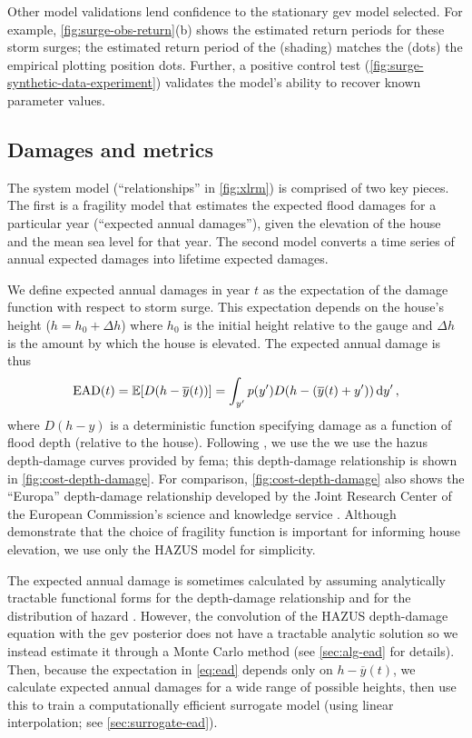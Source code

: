 \documentclass[11pt]{article}
\makeatletter
\DeclareRobustCommand\onedot{\futurelet\@let@token\@onedot}
\def\@onedot{\ifx\@let@token.\else.\null\fi\xspace}
\def\eg{\emph{e.g}\onedot} \def\Eg{\emph{E.g}\onedot}
\DeclareRobustCommand\onedot{\futurelet\@let@token\@onedot}
\def\@onedot{\ifx\@let@token.\else.\null\fi\xspace}
\def\eg{\emph{e.g}\onedot} \def\Eg{\emph{E.g}\onedot}
\makeatother
\begin{document}
Other model validations lend confidence to the stationary \gls{gev} model selected.
For example, \cref{fig:surge-obs-return}(b) shows the estimated return periods for these storm surges; the estimated return period of the (shading) matches the (dots) the empirical plotting position dots.
Further, a positive control test (\cref{fig:surge-synthetic-data-experiment}) validates the model's ability to recover known parameter values.

\subsection{Damages and metrics}\label{sec:case-metrics}

The system model (``relationships'' in \cref{fig:xlrm}) is comprised of two key pieces.
The first is a fragility model that estimates the expected flood damages for a particular year (``expected annual damages''), given the elevation of the house and the mean sea level for that year.
The second model converts a time series of annual expected damages into lifetime expected damages.

We define expected annual damages in year $t$ as the expectation of the damage function with respect to storm surge.
This expectation depends on the house's height ($h = h_0 + \Delta h$) where $h_0$ is the initial height relative to the gauge and $\Delta h$ is the amount by which the house is elevated.
The expected annual damage is thus
\begin{equation}\label{eq:ead}
    \textrm{EAD}(t) = \mathbb{E}[D \qty(h-\overline{y}(t))] = \int_{y'} p(y') D \qty(h - \qty(\overline{y}(t) + y')) \dd{y'},
\end{equation}
where $D(h-y)$ is a deterministic function specifying damage as a function of flood depth (relative to the house).
Following \citet{zarekarizi_suboptimal:2020}, we use the we use the \gls{hazus} depth-damage curves provided by \gls{fema}; this depth-damage relationship is shown in \cref{fig:cost-depth-damage}.
For comparison, \cref{fig:cost-depth-damage} also shows the ``Europa'' depth-damage relationship developed by the Joint Research Center of the European Commission's science and knowledge service \citep{huizinga_depthdamage:2016}.
Although \citet{zarekarizi_suboptimal:2020} demonstrate that the choice of fragility function is important for informing house elevation, we use only the HAZUS model for simplicity.

The expected annual damage is sometimes calculated by assuming analytically tractable functional forms for the depth-damage relationship and for the  distribution of hazard \citep[\eg][]{vandantzig_dike:1956}.
However, the convolution of the HAZUS depth-damage equation with the \gls{gev} posterior does not have a tractable analytic solution so we instead estimate it through a Monte Carlo method (see \cref{sec:alg-ead} for details).
Then, because the expectation in \cref{eq:ead} depends only on $h-\overline{y}(t)$, we calculate expected annual damages for a wide range of possible heights, then use this to train a computationally efficient surrogate model (using linear interpolation; see \cref{sec:surrogate-ead}).
\end{document}
